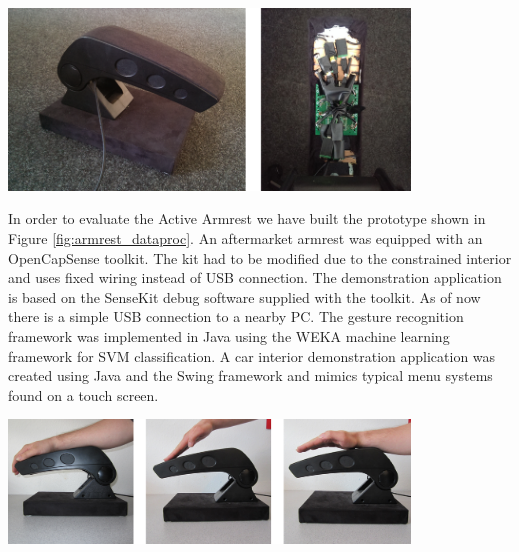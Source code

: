 \begin{minipage}{\linewidth}
\centering
\includegraphics[width=0.8\textwidth]{images/armrest_proto}
\label{fig:armrest_proto}
\end{minipage}

In order to evaluate the Active Armrest we have built the prototype shown in Figure \ref{fig:armrest_dataproc}. An aftermarket armrest was equipped with an OpenCapSense toolkit. The kit had to be modified due to the constrained interior and uses fixed wiring instead of USB connection. The demonstration application is based on the SenseKit debug software supplied with the toolkit. As of now there is a simple USB connection to a nearby PC. The gesture recognition framework was implemented in Java using the WEKA machine learning framework for SVM classification. A car interior demonstration application was created using Java and the Swing framework and mimics typical menu systems found on a touch screen.

\begin{minipage}{\linewidth}
\centering
\includegraphics[width=0.8\textwidth]{images/armrest_postures}
\label{fig:armrest_postures}
\end{minipage}

